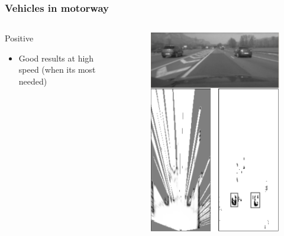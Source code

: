 \documentclass{beamer}
\begin{document}
	\begin{frame}
		\frametitle{Vehicles in motorway}
		\begin{columns}[t]
			\begin{column}[t]{5cm}
				\begin{exampleblock}{Positive}
				\begin{itemize}
				\item Good results at high speed (when its most needed)
				\end{itemize}
				\end{exampleblock}
			\end{column}
			\begin{column}[t]{5cm}
				\begin{figure}[h]
				\center
				\includegraphics[scale=0.55]{../img/fig:result:scenetwocarshighway}
				\end{figure}
			\end{column}
		\end{columns}		

	\end{frame}
	
\end{document}
